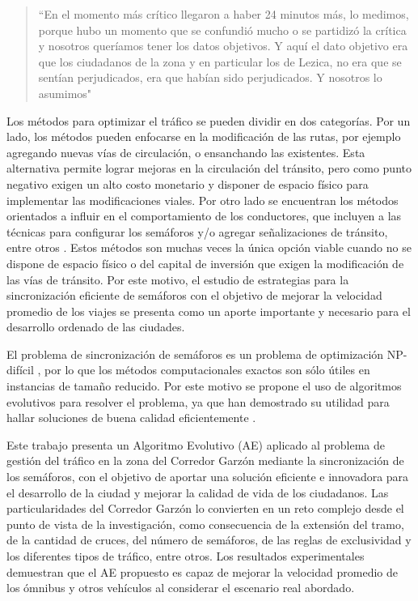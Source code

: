 \begin{quote}\small
	``En el momento más crítico llegaron a haber 24 minutos más, lo medimos, porque hubo un momento que se confundió mucho o se partidizó la crítica y nosotros queríamos tener los datos objetivos. Y aquí el dato objetivo era que los ciudadanos de la zona y en particular los de Lezica, no era que se sentían perjudicados, era que habían sido perjudicados. Y nosotros lo asumimos"
\end{quote}

Los métodos para optimizar el tráfico se pueden dividir en dos categorías. Por un lado, los métodos pueden enfocarse en la modificación de las rutas, por ejemplo agregando nuevas vías de circulación, o ensanchando las existentes. Esta alternativa permite lograr mejoras en la circulación del tránsito, pero como punto negativo exigen un alto costo monetario \citep{litman2009transportation} y disponer de espacio físico para implementar las modificaciones viales. Por otro lado se encuentran los métodos orientados a influir en el comportamiento de los conductores, que incluyen a las técnicas para configurar los semáforos y/o agregar señalizaciones de tránsito, entre otros \citep{mckenney2013distributed}. Estos métodos son muchas veces la única opción viable cuando no se dispone de espacio físico o del capital de inversión que exigen la modificación de las vías de tránsito. Por este motivo, el estudio de estrategias para la sincronización eficiente de semáforos con el objetivo de mejorar la velocidad promedio de los viajes se presenta como un aporte importante y necesario para el desarrollo ordenado de las ciudades. 

El problema de sincronización de semáforos es un problema de optimización NP-difícil \citep{yang1996model}, por lo que los métodos computacionales exactos son sólo útiles en instancias de tamaño reducido. Por este motivo se propone el uso de algoritmos evolutivos para resolver el problema, ya que han demostrado su utilidad para hallar soluciones de buena calidad eficientemente \citep{Sanchez2007,Sanchez2010,Rouphail2000,Sanchez2008}.

Este trabajo presenta un Algoritmo Evolutivo (AE) aplicado al problema de gestión del tráfico en la zona del Corredor Garzón mediante la sincronización de los semáforos, con el objetivo de aportar una solución eficiente e innovadora para el desarrollo de la ciudad y mejorar la calidad de vida de los ciudadanos. Las particularidades del Corredor Garzón lo convierten en un reto complejo desde el punto de vista de la investigación, como consecuencia de la extensión del tramo, de la cantidad de cruces, del número de semáforos, de las reglas de exclusividad y los diferentes tipos de tráfico, entre otros. Los resultados experimentales demuestran que el AE propuesto es capaz de mejorar la velocidad promedio de los ómnibus y otros vehículos al considerar el escenario real abordado.



